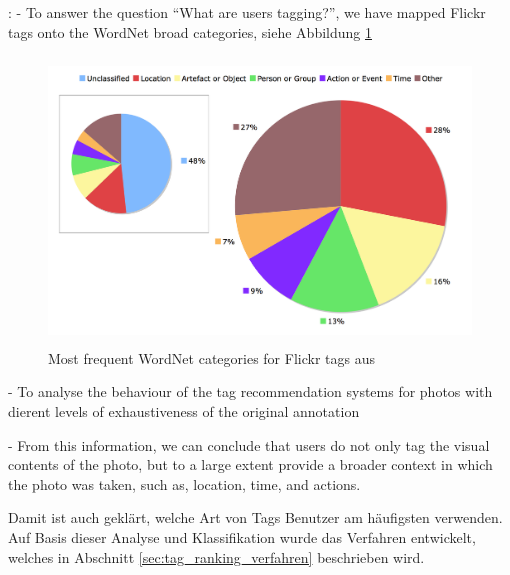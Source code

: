 \cite{collectiveKnowledge}: 
- To answer the question “What are users tagging?”, we have mapped Flickr tags onto the WordNet broad categories, siehe Abbildung \ref{fig:collectiveKnowledge_word_net_categories}

\begin{figure}[htbp]
  \centering
    \includegraphics[height=3in]{images/collectiveKnowledge_word_net_categories.png}
  \caption{Most frequent WordNet categories for Flickr tags aus \cite{collectiveKnowledge}}
  \label{fig:collectiveKnowledge_word_net_categories}
\end{figure}


- To analyse the behaviour of the tag recommendation systems for photos with dierent levels of exhaustiveness of the original annotation

- From this information, we can conclude that users do not only tag the visual contents of the photo, but to a large extent provide a broader context in which the photo was taken, such as, location, time, and actions.

Damit ist auch geklärt, welche Art von Tags Benutzer am häufigsten verwenden. Auf Basis dieser Analyse und Klassifikation wurde das Verfahren entwickelt, welches in Abschnitt \ref{sec:tag_ranking_verfahren} beschrieben wird.






